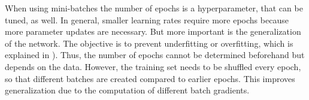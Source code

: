 When using mini-batches the number of epochs is a hyperparameter, that can be tuned, as well.
In general, smaller learning rates require more epochs because more parameter updates are necessary.
But more important is the generalization of the network.
The objective is to prevent underfitting or overfitting, which is explained in ).
Thus, the number of epochs cannot be determined beforehand but depends on the data.
However, the training set needs to be shuffled every epoch, so that different batches are created compared to earlier epochs.
This improves generalization due to the computation of different batch gradients.